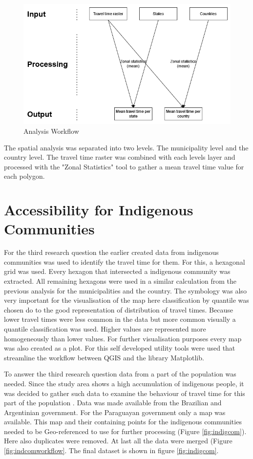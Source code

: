 \documentclass[11pt, a4paper]{report}
\begin{document}
\begin{figure}[H]
  \centering
  \includegraphics[width=0.9\linewidth]{figures/analysisworkflow.png}
  \caption{Analysis Workflow}
  \label{fig:analysisworkflow}
\end{figure}

The spatial analysis was separated into two levels. The municipality level and the country level. The travel time raster was combined with each levels layer and processed with the "Zonal Statistics" tool to gather a mean travel time value for each polygon.

\section{Accessibility for Indigenous Communities}\label{sec:method:indigenous}

For the third research question the earlier created data from indigenous communities was used to identify the travel time for them. For this, a hexagonal grid was used. Every hexagon that intersected a indigenous community was extracted. All remaining hexagons were used in a similar calculation from the previous analysis for the municipalities and the country. The symbology was also very important for the visualisation of the map here classification by quantile was chosen do to the good representation of distribution of travel times. Because lower travel times were less common in the data but more common visually a quantile classification was used. Higher values are represented more homogeneously than lower values. For further visualisation purposes every map was also created as a plot. For this self developed utility tools were used that streamline the workflow between QGIS and the library Matplotlib. 


To answer the third research question data from a part of the population was needed. Since the study area shows a high accumulation of indigenous people, it was decided to gather such data to examine the behaviour of travel time for this part of the population \citet{berger_indigenous_2024}. Data was made available from the Brazilian and Argentinian government. For the Paraguayan government only a map was available. This map and their containing points for the indigenous communities needed to be Geo-referenced to use for further processing (Figure \ref{fig:indigcom}). Here also duplicates were removed. At last all the data were merged (Figure \ref{fig:indcomworkflow}. The final dataset is shown in figure \ref{fig:indigcom}.
\end{document}
